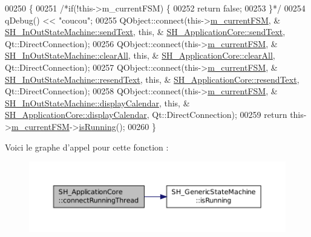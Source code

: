 \begin{DoxyCode}
00250 \{
00251     \textcolor{comment}{/*if(!this->m\_currentFSM) \{}
00252 \textcolor{comment}{        return false;}
00253 \textcolor{comment}{    \}*/}
00254     qDebug() << \textcolor{stringliteral}{"coucou"};
00255     QObject::connect(this->\hyperlink{classSH__ApplicationCore_a8e550daf4a5d49d88714b716953e4957}{m\_currentFSM}, &
      \hyperlink{classSH__InOutStateMachine_a5e7f5958bae31696b6a8deab94ad2b4f}{SH\_InOutStateMachine::sendText}, \textcolor{keyword}{this}, &
      \hyperlink{classSH__ApplicationCore_aeaf9c78e68e7f55564f75e07d0f327aa}{SH\_ApplicationCore::sendText}, Qt::DirectConnection);
00256         QObject::connect(this->\hyperlink{classSH__ApplicationCore_a8e550daf4a5d49d88714b716953e4957}{m\_currentFSM}, &
      \hyperlink{classSH__InOutStateMachine_aa1d5860888c96ff94c55dc77e0fdfdcf}{SH\_InOutStateMachine::clearAll}, \textcolor{keyword}{this}, &
      \hyperlink{classSH__ApplicationCore_ab03fe18921573a2566d587189173f691}{SH\_ApplicationCore::clearAll}, Qt::DirectConnection);
00257         QObject::connect(this->\hyperlink{classSH__ApplicationCore_a8e550daf4a5d49d88714b716953e4957}{m\_currentFSM}, &
      \hyperlink{classSH__InOutStateMachine_a526822c66b46aa0cd81ba4473fa5573f}{SH\_InOutStateMachine::resendText}, \textcolor{keyword}{this}, &
      \hyperlink{classSH__ApplicationCore_a83dbcb859d0d31a6487086150e430d6b}{SH\_ApplicationCore::resendText}, Qt::DirectConnection);
00258     QObject::connect(this->\hyperlink{classSH__ApplicationCore_a8e550daf4a5d49d88714b716953e4957}{m\_currentFSM}, &
      \hyperlink{classSH__InOutStateMachine_ab3a12d1f9b658d8ffdc17669a6c065f2}{SH\_InOutStateMachine::displayCalendar}, \textcolor{keyword}{this}, &
      \hyperlink{classSH__ApplicationCore_acb00dec6d5cc096ca99e8d0235dd8095}{SH\_ApplicationCore::displayCalendar}, Qt::DirectConnection);
00259     \textcolor{keywordflow}{return} this->\hyperlink{classSH__ApplicationCore_a8e550daf4a5d49d88714b716953e4957}{m\_currentFSM}->\hyperlink{classSH__GenericStateMachine_a7e650d582a4c1b8cf2869fb5873b36a9}{isRunning}();
00260 \}
\end{DoxyCode}


Voici le graphe d'appel pour cette fonction \-:
\nopagebreak
\begin{figure}[H]
\begin{center}
\leavevmode
\includegraphics[width=350pt]{classSH__ApplicationCore_a264c6e0c0c2e25a36a2502d1d9bcb109_cgraph}
\end{center}
\end{figure}





